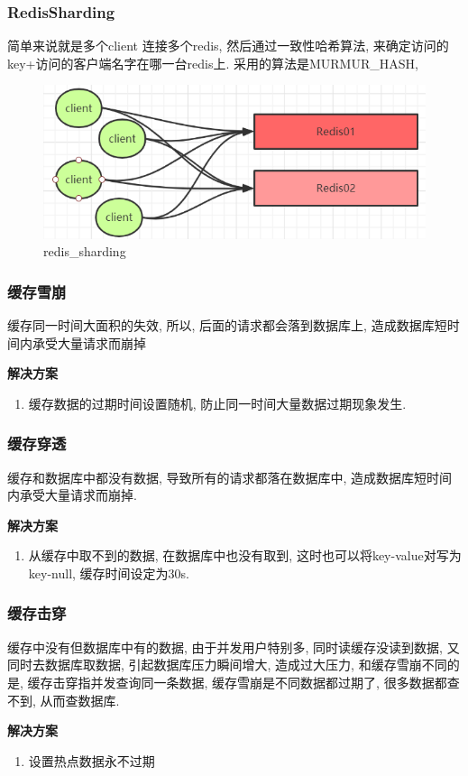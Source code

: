 \documentclass[UTF8]{ctexart}
\begin{document}
\subsubsection{RedisSharding}
简单来说就是多个client 连接多个redis, 然后通过一致性哈希算法, 来确定访问的key+访问的客户端名字在哪一台redis上.
采用的算法是MURMUR\_HASH, 
\begin{figure}
	\centering
	\includegraphics[width=0.7\linewidth]{figures/redis_sharding.png}
	\caption{redis\_sharding}
	\label{fig:redissharding}
\end{figure}
\subsubsection{缓存雪崩}
缓存同一时间大面积的失效, 所以, 后面的请求都会落到数据库上, 造成数据库短时间内承受大量请求而崩掉

\par
\textbf{解决方案}
\begin{enumerate}
	
	\item 缓存数据的过期时间设置随机, 防止同一时间大量数据过期现象发生.

\end{enumerate}

\subsubsection{缓存穿透}
缓存和数据库中都没有数据, 导致所有的请求都落在数据库中, 造成数据库短时间内承受大量请求而崩掉.
\par
\textbf{解决方案}
\begin{enumerate}
	
	\item 从缓存中取不到的数据, 在数据库中也没有取到, 这时也可以将key-value对写为key-null, 缓存时间设定为30s.
	
\end{enumerate}

\subsubsection{缓存击穿}
缓存中没有但数据库中有的数据, 由于并发用户特别多, 同时读缓存没读到数据, 又同时去数据库取数据, 引起数据库压力瞬间增大, 造成过大压力, 和缓存雪崩不同的是, 缓存击穿指并发查询同一条数据, 缓存雪崩是不同数据都过期了, 很多数据都查不到, 从而查数据库.
\par
\textbf{解决方案}
\begin{enumerate}
	\item 设置热点数据永不过期	
\end{enumerate}
\end{document}
